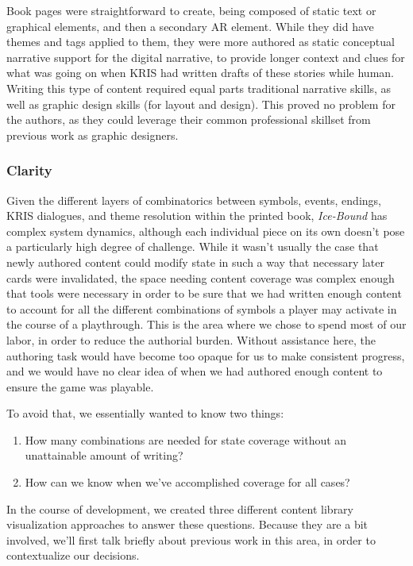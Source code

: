 Book pages were straightforward to create, being composed of static text or graphical elements, and then a secondary AR element. While they did have themes and tags applied to them, they were more authored as static conceptual narrative support for the digital narrative, to provide longer context and clues for what was going on when KRIS had written drafts of these stories while human. Writing this type of content required equal parts traditional narrative skills, as well as graphic design skills (for layout and design). This proved no problem for the authors, as they could leverage their common professional skillset from previous work as graphic designers.

\subsubsection{Clarity}\label{par:icebound-clarity}

Given the different layers of combinatorics between symbols, events, endings, KRIS dialogues, and theme resolution within the printed book, \textit{Ice-Bound} has complex system dynamics, although each individual piece on its own doesn't pose a particularly high degree of challenge. While it wasn't usually the case that newly authored content could modify state in such a way that necessary later cards were invalidated, the space needing content coverage was complex enough that tools were necessary in order to be sure that we had written enough content to account for all the different combinations of symbols a player may activate in the course of a playthrough. This is the area where we chose to spend most of our labor, in order to reduce the authorial burden. Without assistance here, the authoring task would have become too opaque for us to make consistent progress, and we would have no clear idea of when we had authored enough content to ensure the game was playable.

To avoid that, we essentially wanted to know two things: 

\begin{enumerate}
    \item How many combinations are needed for state coverage without an unattainable amount of writing?
    \item How can we know when we've accomplished coverage for all cases?
\end{enumerate}

In the course of development, we created three different content library visualization approaches to answer these questions. Because they are a bit involved, we'll first talk briefly about previous work in this area, in order to contextualize our decisions.

